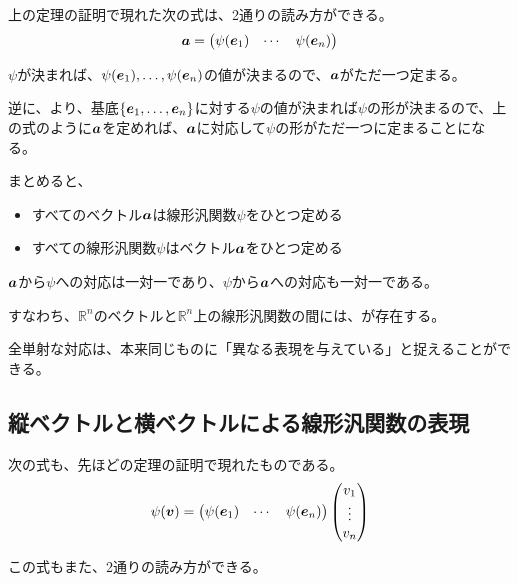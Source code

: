 \documentclass[../../../topic_linear-algebra]{subfiles}
\begin{document}
上の定理の証明で現れた次の式は、2通りの読み方ができる。
\begin{equation*}
  \vb*{a} = \begin{pmatrix}
    \psi(\vb*{e}_1) & \cdots & \psi(\vb*{e}_n)
  \end{pmatrix}
\end{equation*}

$\psi$が決まれば、$\psi(\vb*{e}_1), \ldots, \psi(\vb*{e}_n)$の値が決まるので、$\vb*{a}$がただ一つ定まる。

逆に、より、基底$\{\vb*{e}_1, \ldots, \vb*{e}_n\}$に対する$\psi$の値が決まれば$\psi$の形が決まるので、上の式のように$\vb*{a}$を定めれば、$\vb*{a}$に対応して$\psi$の形がただ一つに定まることになる。

\br

まとめると、
\begin{itemize}
  \item すべてのベクトル$\vb*{a}$は線形汎関数$\psi$をひとつ定める
  \item すべての線形汎関数$\psi$はベクトル$\vb*{a}$をひとつ定める
\end{itemize}

$\vb*{a}$から$\psi$への対応は一対一であり、$\psi$から$\vb*{a}$への対応も一対一である。

すなわち、$\mathbb{R}^n$のベクトルと$\mathbb{R}^n$上の線形汎関数の間には、が存在する。

\br

全単射な対応は、本来同じものに「異なる表現を与えている」と捉えることができる。

\subsection{縦ベクトルと横ベクトルによる線形汎関数の表現}\label{sec:column-row-functional}

次の式も、先ほどの定理の証明で現れたものである。
\begin{equation*}
  \psi(\vb*{v}) = \begin{pmatrix}
    \psi(\vb*{e}_1) & \cdots & \psi(\vb*{e}_n)
  \end{pmatrix} \begin{pmatrix}
    v_1 \\
    \vdots \\
    v_n
  \end{pmatrix}
\end{equation*}

この式もまた、2通りの読み方ができる。
\end{document}
